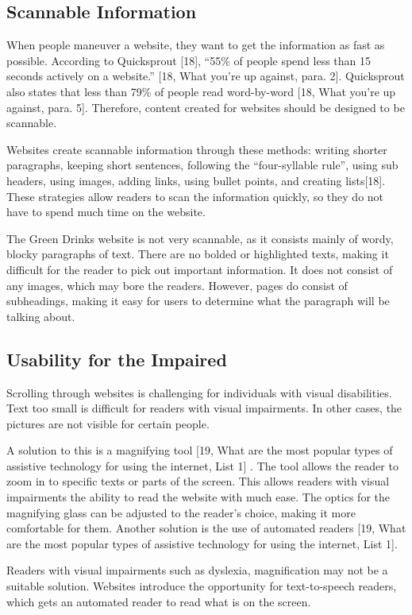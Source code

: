 \documentclass[12pt]{article}
\begin{document}
\subsection*{Scannable Information}
When people maneuver a website, they want to get the information as fast as possible. According to Quicksprout [18], “55\% of people spend less than 15 seconds actively on a website.” [18, What you’re up against, para. 2]. Quicksprout also states that less than 79\% of people read word-by-word [18, What you’re up against, para. 5]. Therefore, content created for websites should be designed to be scannable. 

Websites create scannable information through these methods: writing shorter paragraphs, keeping short sentences, following the “four-syllable rule”, using sub headers, using images, adding links, using bullet points, and creating lists[18]. These strategies allow readers to scan the information quickly, so they do not have to spend much time on the website.

The Green Drinks website is not very scannable, as it consists mainly of wordy, blocky paragraphs of text. There are no bolded or highlighted texts, making it difficult for the reader to pick out important information. It does not consist of any images, which may bore the readers. However, pages do consist of subheadings, making it easy for users to determine what the paragraph will be talking about.

\subsection*{Usability for the Impaired}
Scrolling through websites is challenging for individuals with visual disabilities. Text too small is difficult for readers with visual impairments. In other cases, the pictures are not visible for certain people.

A solution to this is a magnifying tool [19, What are the most popular types of assistive technology for using the internet, List 1] . The tool allows the reader to zoom in to specific texts or parts of the screen. This allows readers with visual impairments the ability to read the website with much ease. The optics for the magnifying glass can be adjusted to the reader’s choice, making it more comfortable for them. Another solution is the use of automated readers [19, What are the most popular types of assistive technology for using the internet, List 1]. 

Readers with visual impairments such as dyslexia, magnification may not be a suitable solution. Websites introduce the opportunity for text-to-speech readers, which gets an automated reader to read what is on the screen.
\end{document}
